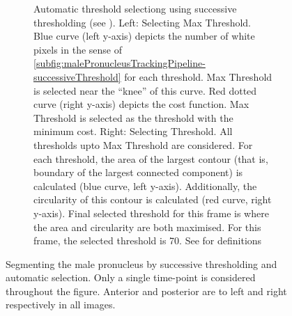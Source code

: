 \begin{figure}[p]
\begin{subfigure}{\textwidth}
    \caption{Automatic threshold selectiong using successive thresholding (see ). Left: Selecting Max Threshold. Blue curve (left y-axis) depicts the number of white pixels in the sense of \autoref{subfig:malePronucleusTrackingPipeline-successiveThreshold} for each threshold. Max Threshold is selected near the \enquote{knee} of this curve. Red dotted curve (right y-axis) depicts the cost function. Max Threshold is selected as the threshold with the minimum cost. Right: Selecting Threshold. All thresholds upto Max Threshold are considered. For each threshold, the area of the largest contour (that is, boundary of the largest connected component) is calculated (blue curve, left y-axis). Additionally, the circularity of this contour is calculated (red curve, right y-axis). Final selected threshold for this frame is where the area and circularity are both maximised. For this frame, the selected threshold is \num{70}. See  for definitions} 
    \label{subfig:malePronucleusTrackingPipeline-thresholdSelection}
\end{subfigure}
\caption[Image analysis: Segmenting the male pronucleus]{Segmenting the male pronucleus by successive thresholding and automatic selection. Only a single time-point is considered throughout the figure. Anterior and posterior are to left and right respectively in all images.}
\label{fig:malePronucleusTrackingPipeline}
\end{figure}

